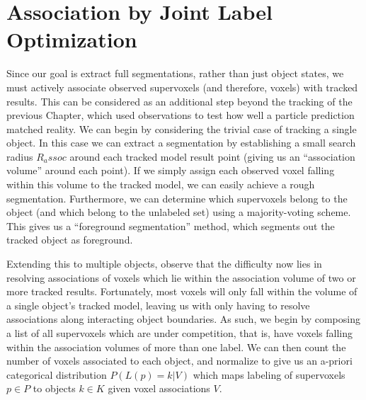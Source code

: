 \section{Association by Joint Label Optimization}
Since our goal is extract full segmentations, rather than just object states, we must actively associate observed supervoxels (and therefore, voxels) with tracked results. This can be considered as an additional step beyond the tracking of the previous Chapter, which used observations to test how well a particle prediction matched reality. We can begin by considering the trivial case of tracking a single object. In this case we can extract a segmentation by establishing a small search radius $R_assoc$ around each tracked model result point (giving us an ``association volume'' around each point). If we simply assign each observed voxel falling within this volume to the tracked model, we can easily achieve a rough segmentation. Furthermore, we can determine which supervoxels belong to the object (and which belong to the unlabeled set) using a majority-voting scheme. This gives us a ``foreground segmentation'' method, which segments out the tracked object as foreground. 

Extending this to multiple objects, observe that the difficulty now lies in resolving associations of voxels which lie within the association volume of two or more tracked results. Fortunately, most voxels will only fall within the volume of a single object's tracked model, leaving us with only having to resolve associations along interacting object boundaries. As such, we begin by composing a list of all supervoxels which are under competition, that is, have voxels falling within the association volumes of more than one label. We can then count the number of voxels associated to each object, and normalize to give us an a-priori categorical distribution ${P}(L(p) = k | V )$ which maps labeling of supervoxels $p \in P$  to objects $k \in K$ given voxel associations $V$.  

